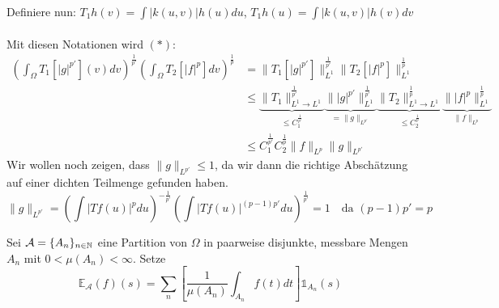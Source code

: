 \begin{beweis}
\begin{itemize}
			Definiere nun: $T_{1} h(v) = \int |k(u, v)| h(u) du$, $T_{1} h(u) = \int |k(u, v)| h(v) dv $ \\ \\
			Mit diesen Notationen wird $(*)$:
			\begin{align*}
				\left( \int_{\Omega} T_{1}[|g|^{p'}](v) dv \right)^{\frac{1}{p'}} \left( \int_{\Omega} T_{2} [|f|^{p}] dv \right)^{\frac{1}{p}} & = \| T_{1}[|g|^{p'}] \|_{L^{1}}^{\frac{1}{p'}} \| T_{2}[|f|^{p}] \|_{L^{1}}^{\frac{1}{p}} \\
				& \leq \underbrace{\| T_{1} \|_{L^{1} \rightarrow L^{1}}^{\frac{1}{p'}}}_{\leq C_{1}^{\frac{1}{p'}}} \underbrace{\||g|^{p'}\|_{L^{1}}^{\frac{1}{p'}}}_{= \|g\|_{L^{p'}}} \underbrace{\| T_{2} \|_{L^{1} \rightarrow L^{1}}^{\frac{1}{p}}}_{\leq C_{2}^{\frac{1}{p}}} \underbrace{\||f|^{p}\|_{L^{1}}^{\frac{1}{p}}}_{\| f \|_{L^{p}}} \\
            & \leq C_{1}^{\frac{1}{p'}} C_{2}^{\frac{1}{p}} \| f \|_{L^{p}} \| g \|_{L^{p'}}
            \end{align*}
            Wir wollen noch zeigen, dass $\| g \|_{L^{p'}} \leq 1$, da wir dann die richtige Abschätzung auf einer dichten Teilmenge gefunden haben.
            \[ \| g \|_{L^{p'}} = \left( \int | T f(u) |^{p} du \right)^{- \frac{1}{p'}} \left( \int |T f(u)|^{(p-1)p'} du \right)^{\frac{1}{p'}} = 1 \quad \text{da } (p - 1) p' = p \]
    \end{itemize}	
\end{beweis}


\begin{definition} 
	Sei $\mathcal{A} = \{ A_{n} \}_{n \in \mathbb{N}}$ eine Partition von $\Omega$ in paarweise disjunkte, messbare Mengen $A_{n}$ mit $0 < \mu(A_{n}) < \infty$. Setze
	\[ \mathds{E}_{\mathcal{A}}(f)(s) = \sum_{n} \left[ \frac{1}{\mu(A_{n})} \int_{A_{n}} f(t) dt \right] \mathds{1}_{A_{n}}(s) \] 
\end{definition}


